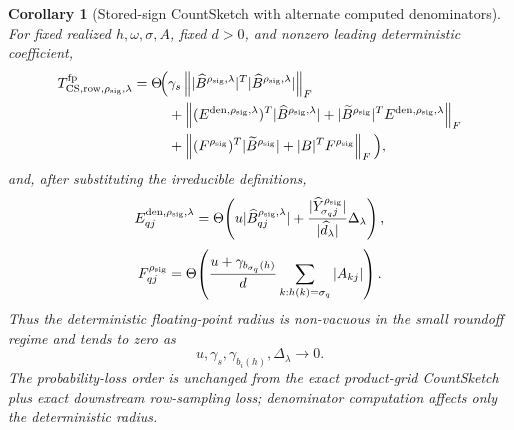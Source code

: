 \documentclass[11pt]{article}
\newcommand{\Frob}[1]{\left\lVert #1\right\rVert_F}
\newtheorem{corollary}[theorem]{Corollary}
\theoremstyle{remark}
\begin{document}
\begin{corollary}[Stored-sign CountSketch with alternate computed denominators]
For fixed realized \(h,\omega,\sigma,A\), fixed \(d>0\), and nonzero leading
deterministic coefficient,
\[
  \begin{aligned}
  T_{{\rm CS,row},\rho_{\rm sig},\lambda}^{\rm fp}
  =
  \Theta\!\Big(
  &\gamma_s
      \Frob{|\widehat B^{\rho_{\rm sig},\lambda}|^T
            |\widehat B^{\rho_{\rm sig},\lambda}|}
  \\
  &+
    \Frob{(E^{{\rm den},\rho_{\rm sig},\lambda})^T
          |\widehat B^{\rho_{\rm sig},\lambda}|
          +
          |\widetilde B^{\rho_{\rm sig}}|^T
          E^{{\rm den},\rho_{\rm sig},\lambda}}
  \\
  &+
    \Frob{(F^{\rho_{\rm sig}})^T
          |\widetilde B^{\rho_{\rm sig}}|
          +
          |B|^TF^{\rho_{\rm sig}}}
  \Big),
  \end{aligned}
\]
and, after substituting the irreducible definitions,
\[
  E^{{\rm den},\rho_{\rm sig},\lambda}_{qj}
  =
  \Theta\!\left(
    u|\widehat B^{\rho_{\rm sig},\lambda}_{qj}|
    +
    \frac{|\widehat Y^{\rho_{\rm sig}}_{\sigma_qj}|}
         {|\widehat d_\lambda|}\Delta_\lambda
  \right),
\]
\[
  F^{\rho_{\rm sig}}_{qj}
  =
  \Theta\!\left(
    \frac{u+\gamma_{b_{\sigma_q}(h)}}{d}
    \sum_{k:h(k)=\sigma_q}|A_{kj}|
  \right).
\]
Thus the deterministic floating-point radius is non-vacuous in the small
roundoff regime and tends to zero as
\[
  u,\gamma_s,\gamma_{b_i(h)},\Delta_\lambda\to0.
\]
The probability-loss order is unchanged from the exact product-grid
CountSketch plus exact downstream row-sampling loss; denominator computation
affects only the deterministic radius.
\end{corollary}
\end{document}
